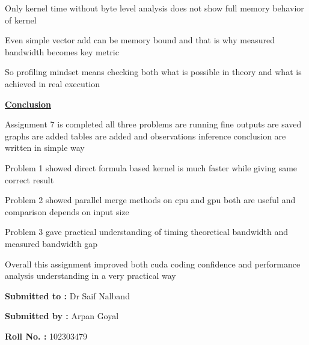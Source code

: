 \documentclass[12pt]{article}
\begin{document}
Only kernel time without byte level analysis does not show full memory behavior of kernel

Even simple vector add can be memory bound and that is why measured bandwidth becomes key metric

So profiling mindset means checking both what is possible in theory and what is achieved in real execution

\vspace{1cm}

\textbf{\Large \underline{Conclusion}}

\vspace{1cm}

Assignment 7 is completed all three problems are running fine outputs are saved graphs are added tables are added and observations inference conclusion are written in simple way

Problem 1 showed direct formula based kernel is much faster while giving same correct result

Problem 2 showed parallel merge methods on cpu and gpu both are useful and comparison depends on input size

Problem 3 gave practical understanding of timing theoretical bandwidth and measured bandwidth gap

Overall this assignment improved both cuda coding confidence and performance analysis understanding in a very practical way

\vspace{2cm}

\textbf{Submitted to :} Dr Saif Nalband

\textbf{Submitted by :} Arpan Goyal

\textbf{Roll No. :} 102303479
\end{document}
